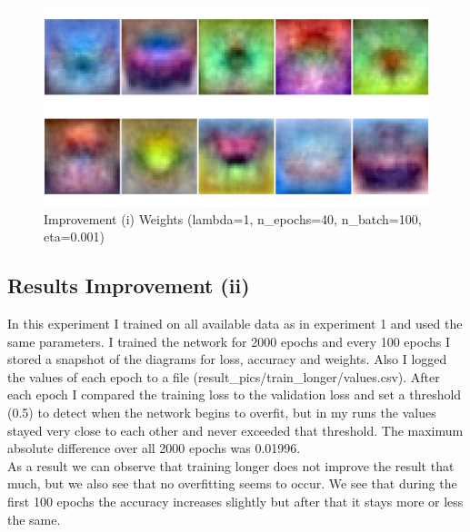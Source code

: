     \begin{figure}[ht]
        \includegraphics[width=\textwidth]{../code/result_pics/lambda=1, n_epochs=40, n_batch=100, eta=.001 all data for training/weights.png}
        \caption{Improvement (i) Weights (lambda=1, n\_epochs=40, n\_batch=100, eta=0.001)}
        \label{fig:weightsa}
    \end{figure}

\clearpage

\subsection{Results Improvement (ii)}
In this experiment I trained on all available data as in experiment 1 and used the same parameters. I trained the network for 2000 epochs and 
every 100 epochs I stored a snapshot of the diagrams for loss, accuracy and weights. 
Also I logged the values of each epoch to a file (result\_pics/train\_longer/values.csv). After each epoch I compared the training loss to 
the validation loss and set a threshold (0.5) to detect when the network begins to overfit, but in my runs the values stayed very close to each other 
and never exceeded that threshold. The maximum absolute difference over all 2000 epochs was 0.01996.\\
As a result we can observe that training longer does not improve the result that much, but we also see that no overfitting seems to occur. 
We see that during the first 100 epochs the accuracy increases slightly but after that it stays more or less the same.

